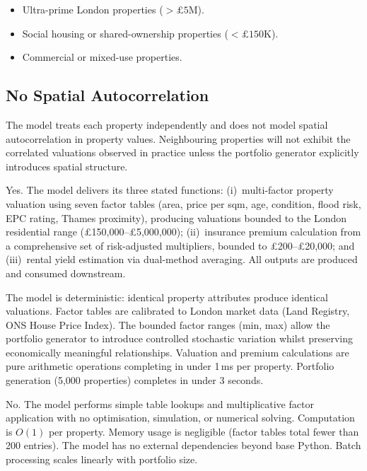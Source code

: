 \documentclass[11pt,a4paper]{article}
\begin{document}
\begin{itemize}
    \item Ultra-prime London properties ($>\pounds5$M).
    \item Social housing or shared-ownership properties ($<\pounds150$K).
    \item Commercial or mixed-use properties.
\end{itemize}

\subsection{No Spatial Autocorrelation}

The model treats each property independently and does not model spatial
autocorrelation in property values. Neighbouring properties will not
exhibit the correlated valuations observed in practice unless the portfolio
generator explicitly introduces spatial structure.


\mkmgovernance

Yes. The model delivers its three stated functions: (i)~multi-factor property valuation using seven factor tables (area, price per sqm, age, condition, flood risk, EPC rating, Thames proximity), producing valuations bounded to the London residential range (\pounds150,000--\pounds5,000,000); (ii)~insurance premium calculation from a comprehensive set of risk-adjusted multipliers, bounded to \pounds200--\pounds20,000; and (iii)~rental yield estimation via dual-method averaging. All outputs are produced and consumed downstream.

The model is deterministic: identical property attributes produce identical valuations. Factor tables are calibrated to London market data (Land Registry, ONS House Price Index). The bounded factor ranges (min, max) allow the portfolio generator to introduce controlled stochastic variation whilst preserving economically meaningful relationships. Valuation and premium calculations are pure arithmetic operations completing in under 1\,ms per property. Portfolio generation (5,000 properties) completes in under 3 seconds.

No. The model performs simple table lookups and multiplicative factor application with no optimisation, simulation, or numerical solving. Computation is $O(1)$ per property. Memory usage is negligible (factor tables total fewer than 200 entries). The model has no external dependencies beyond base Python. Batch processing scales linearly with portfolio size.
\end{document}
